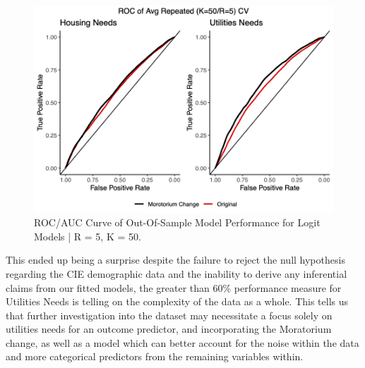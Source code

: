 \documentclass[man, 12pt, donotrepeattitle, floatsintext]{apa7} %
\begin{document}
\begin{figure}[H]
  \includegraphics[width=\linewidth]{figures/auc_roc_out_of_sample.png}
  \caption{ROC/AUC Curve of Out-Of-Sample Model Performance for Logit Models | R = 5, K = 50.}
  \label{auc_roc_out_of_sample}
\end{figure}

This ended up being a surprise despite the failure to reject the null hypothesis regarding the CIE demographic data and the inability to derive any inferential claims from our fitted models, the greater than 60\% performance measure for Utilities Needs is telling on the complexity of the data as a whole. This tells us that further investigation into the dataset may necessitate a focus solely on utilities needs for an outcome predictor, and incorporating the Moratorium change, as well as a model which can better account for the noise within the data and more categorical predictors from the remaining variables within.
\end{document}
